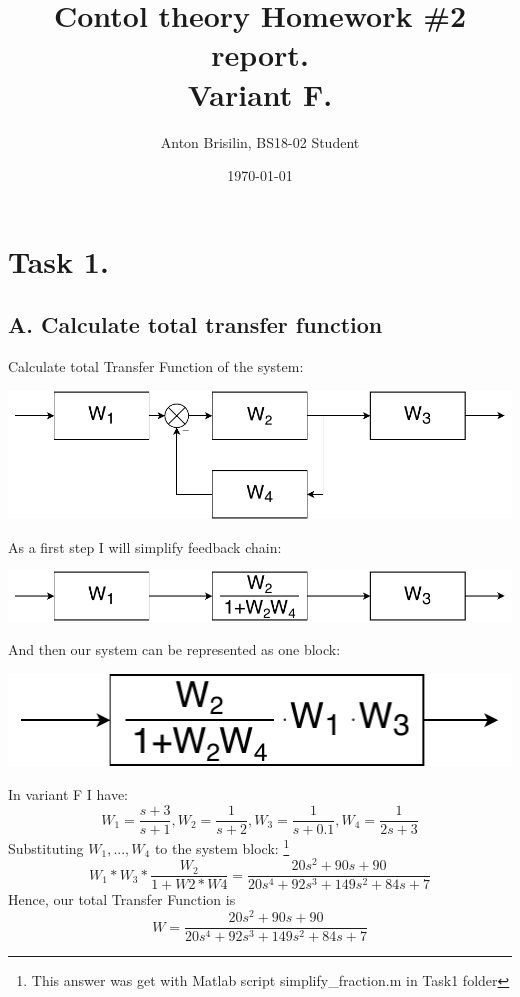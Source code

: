 \documentclass[a4paper,12pt]{article}
\title{Contol theory Homework \#2 report.\\Variant F.}
\author{Anton Brisilin, BS18-02 Student}
\date{\today}
\begin{document}
\maketitle
\section{Task 1.}
\subsection*{A. Calculate total transfer function}
    Calculate total Transfer Function of the system:
    \begin{center}
        \includegraphics[width=\linewidth/2]{../Task1/ToReport/T1Step0.pdf}
    \end{center}
    As a first step I will simplify feedback chain:
    \begin{center}
        \includegraphics[width=\linewidth/2]{../Task1/ToReport/T1Step1.pdf}
    \end{center}
    And then our system can be represented as one block:
    \begin{center}
        \includegraphics[width=0.3\linewidth]{../Task1/ToReport/T1Step2.pdf}
    \end{center}
    In variant F I have:
    \begin{equation*}
    W_1 = \frac{s+3}{s+1}, W_2 = \frac{1}{s+2}, 
    W_3 = \frac{1}{s+0.1}, W_4 = \frac{1}{2s+3}
    \end{equation*}
    Substituting $W_1, ... ,W_4$ to the system block:
    \footnote{This answer was get with Matlab script simplify\_fraction.m in Task1 folder}
    \begin{equation*}
    W_1 * W_3 * \frac{W_2}{1+W2*W4} = 
    \frac{20s^2 + 90s + 90}{20s^4 + 92s^3 + 149s^2 + 84s + 7}
    \end{equation*}
    Hence, our total Transfer Function is 
    \begin{equation}
        W = \frac{20s^2 + 90s + 90}{20s^4 + 92s^3 + 149s^2 + 84s + 7}
    \end{equation}
\end{document}
